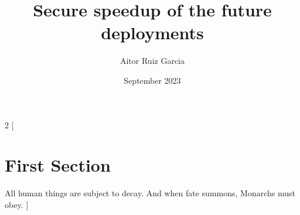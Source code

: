 \documentclass[12pt, letterpaper]{article}
\title{Secure speedup of the future deployments}
\author{Aitor Ruiz Garcia}
\date{September 2023}
\begin{document}
\maketitle
\begin{multicols}{2}
    [
        \section{First Section}
        All human things are subject to decay. And when fate summons, Monarchs must obey.
    ]
    \blindtext\blindtext
\end{multicols}
\end{document}

